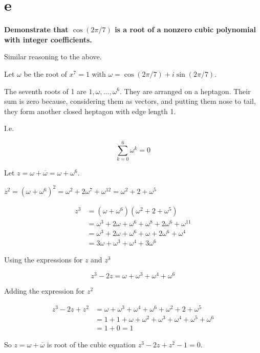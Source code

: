 \documentclass[11pt]{amsart}
\begin{document}
\section{e}

\textbf{
Demonstrate that $\cos(2 \pi / 7)$ is a root of a nonzero cubic polynomial with integer coefficients.
}

Similar reasoning to the above.

Let $\omega$ be the root of $x^{7} = 1$ with $\omega = \cos(2 \pi / 7) + i  \sin(2 \pi / 7)$.

The seventh roots of 1 are $1, \omega, ..., \omega^{6}$. They are arranged on a heptagon. Their sum is zero because, considering them as vectors, and putting them nose to tail, they form another closed heptagon with edge length 1.

I.e. 

$$
\sum_{k=0}^{6} \omega^{k} = 0
$$

Let $z = \omega + \overline{\omega} = \omega + \omega^{6}$.

$z^{2} = (\omega + \omega^{6})^{2} = \omega^{2} + 2 \omega^{7} + \omega^{12}
= \omega^{2} + 2 + \omega^{5}
$

$$
\begin{aligned}
z^{3} &= (\omega + \omega^{6}) (\omega^{2} + 2 + \omega^{5})
\\
&= \omega^{3} + 2 \omega + \omega^{6} + \omega^{8} + 2 \omega^{6} + \omega^{11}
\\
&= \omega^{3} + 2 \omega + \omega^{6} + \omega + 2 \omega^{6} + \omega^{4}
\\
&= 3 \omega + \omega^{3} + \omega^{4} +
3 \omega^{6}
\end{aligned}
$$

Using the expressions for $z$ and $z^{3}$

$$
z^{3} - 2 z =  \omega + \omega^{3} + \omega^{4} + \omega^{6}
$$

Adding the expression for $z^{2}$


$$
\begin{aligned}
z^{3} - 2 z + z^{2 }
&=
\omega + \omega^{3} + \omega^{4} + \omega^{6} + \omega^{2} + 2 + \omega^{5}
\\
&=
1 + 1 + 
\omega + \omega^{2} + \omega^{3} + \omega^{4} + \omega^{5} + \omega^{6}  
\\
&=
1 + 0 = 1
\end{aligned}
$$

So $z = \omega + \overline{\omega}$ is root of the cubic equation $z^{3} - 2 z + z^{2 } - 1 = 0$.
\end{document}
